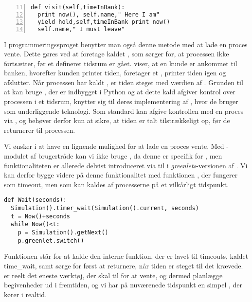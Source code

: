 \begin{lstlisting}[firstnumber=11 , stepnumber=2, numbers=left,float=hbtp, label=fig:simpy:yield, caption= Et yield i \simpy (taget fra Bank05.py i eksemplet fra \simpy)] 
def visit(self,timeInBank): 
  print now(), self.name," Here I am" 
  yield hold,self,timeInBank print now()
  self.name," I must leave" 
\end{lstlisting}
I programmeringssproget \simpy benytter man også denne metode med at lade en proces vente. Dette gøres ved at
foretage kaldet , som sørger for, at processen ikke
fortsætter, før et defineret tidsrum er gået.  viser, at en kunde er ankommet til banken, hvorefter kunden printer tiden, foretager et , printer tiden igen og afslutter.  Når processen har kaldt , er tiden steget med værdien af . Grunden til at \simpy kan bruge , der er indbygget i Python og at dette kald afgiver kontrol over processen i et tidsrum, knytter sig til deres implementering af \simpy, hvor de bruger  som underliggende teknologi. Som standard kan   afgive kontrollen med en proces via , og \simpy behøver derfor kun at sikre, at tiden er talt tilstrækkeligt op, før de returnerer til processen.

 Vi ønsker i \pycsp at have en lignende mulighed for at lade en proces vente. Med -modulet af brugertråde kan vi ikke bruge , da denne er specifik for , men funktionaliteten er allerede delvist introduceret via  til  i \emph{greenlets}-versionen af \pycsp. Vi kan derfor bygge videre på denne funktionalitet med funktionen , der fungerer som timeout, men som kan kaldes af processerne på et vilkårligt tidspunkt.

\begin{lstlisting}[firstnumber=20,float=hbtp, label=fig:wait, caption=Wait i \code{simulering}-versionen.] 
def Wait(seconds):
  Simulation().timer_wait(Simulation().current, seconds)
  t = Now()+seconds
  while Now()<t:
    p = Simulation().getNext() 
    p.greenlet.switch()
\end{lstlisting}

Funktionen  står for at kalde den interne funktion, der er lavet til timeouts, kaldet time\_wait, samt sørge for først at returnere, når tiden er steget til det krævede.  er reelt det eneste værktøj, der skal til for at vente, og dermed planlægge begivenheder ud i fremtiden, og vi har på nuværenede tidspunkt en simpel \des, der kører i realtid. 

